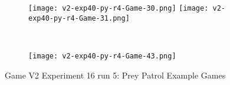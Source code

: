\begin{figure}
  \centering
  \begin{subfigure}{\textwidth}
    \centering
  \texttt{[image: v2-exp40-py-r4-Game-30.png]}  \texttt{[image: v2-exp40-py-r4-Game-31.png]} 
  \end{subfigure} \\\hfill
  
  \begin{subfigure}{\textwidth}
    \centering
  \texttt{[image: v2-exp40-py-r4-Game-43.png]}
  \end{subfigure}
  \caption{Game V2 Experiment 16 run 5: Prey Patrol Example Games \label{fig:v2-prey-patrol}}
  
\end{figure}



